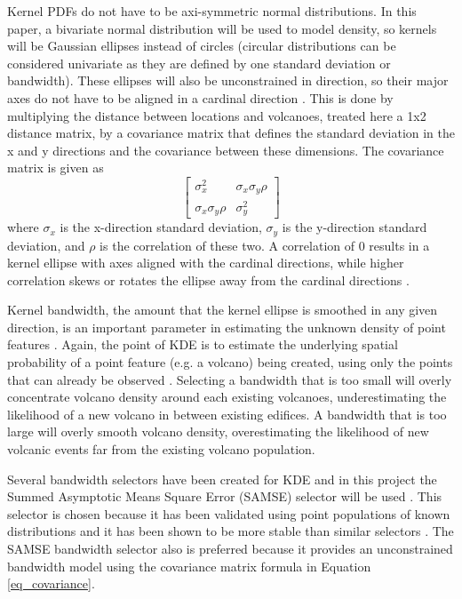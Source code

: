 Kernel PDFs do not have to be axi-symmetric normal distributions. In this paper, a bivariate normal distribution will be used to model density, so kernels will be Gaussian ellipses instead of circles (circular distributions can be considered univariate as they are defined by one standard deviation or bandwidth). These ellipses will also be unconstrained in direction, so their major axes do not have to be aligned in a cardinal direction \citep{wand1993comparison}. This is done by multiplying the distance between locations and volcanoes, treated here a 1x2 distance matrix, by a covariance matrix that defines the standard deviation in the x and y directions and the covariance between these dimensions. The covariance matrix is given as
\begin{equation}\begin{bmatrix}
\sigma_x^2 & \sigma_x\sigma_y\rho\\
\sigma_x\sigma_y\rho & \sigma_y^2
\label{eq_covariance}
\end{bmatrix}\end{equation}
where $\sigma_x$ is the x-direction standard deviation, $\sigma_y$ is the y-direction standard deviation, and $\rho$ is the correlation of these two. A correlation of 0 results in a kernel ellipse with axes aligned with the cardinal directions, while higher correlation skews or rotates the ellipse away from the cardinal directions \citep{wand1993comparison}.

Kernel bandwidth, the amount that the kernel ellipse is smoothed in any given direction, is an important parameter in estimating the unknown density of point features \citep{lutz1995improved,connor2015probabilistic}. Again, the point of KDE is to estimate the underlying spatial probability of a point feature (e.g. a volcano) being created, using only the points that can already be observed \citep{connor2000geologic}. Selecting a bandwidth that is too small will overly concentrate volcano density around each existing volcanoes, underestimating the likelihood of a new volcano in between existing edifices. A bandwidth that is too large will overly smooth volcano density, overestimating the likelihood of new volcanic events far from the existing volcano population.

Several bandwidth selectors have been created for KDE and in this project the Summed Asymptotic Means Square Error (SAMSE) selector will be used \citep{duong2007}. This selector is chosen because it has been validated using point populations of known distributions and it has been shown to be more stable than similar selectors \citep{duong2003}. The SAMSE bandwidth selector also is preferred because it provides an unconstrained bandwidth model using the covariance matrix formula in Equation \ref{eq_covariance}.

